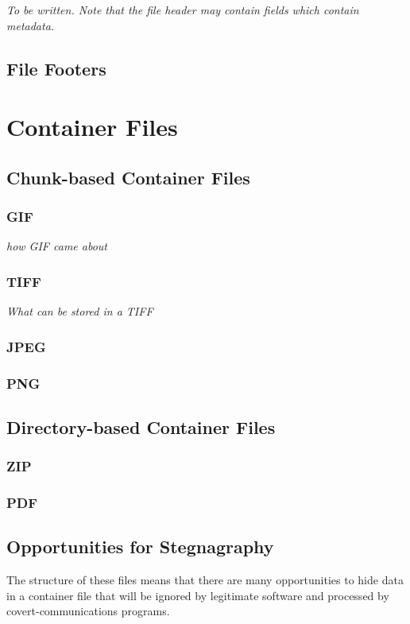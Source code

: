 \emph{To be written. Note that the file header may contain fields
  which contain metadata.}

\subsection{File Footers}

\section{Container Files}

\subsection{Chunk-based Container Files}


\subsubsection{GIF}
\emph{how GIF came about}

\subsubsection{TIFF}
\emph{What can be stored in a TIFF}

\subsubsection{JPEG}\label{jpeg-format}
\subsubsection{PNG}

\subsection{Directory-based Container Files}

\subsubsection{ZIP}

\subsubsection{PDF}

\subsection{Opportunities for Stegnagraphy}
The structure of these files means that there are many opportunities
to hide data in a container file that will be ignored by legitimate
software and processed by covert-communications programs.

